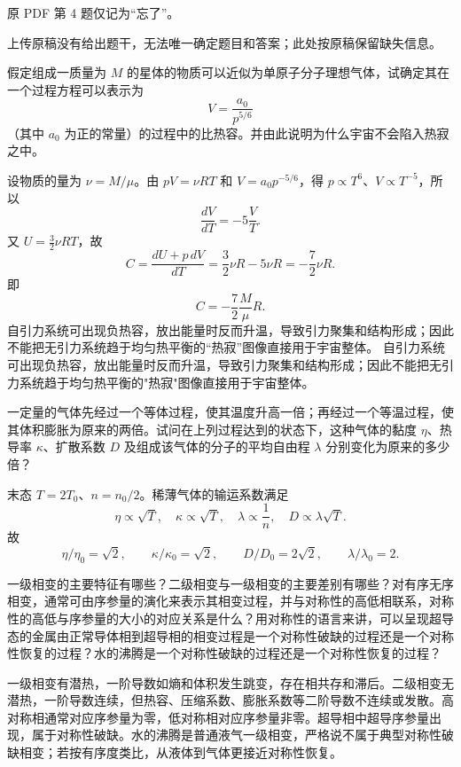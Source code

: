 \begin{question}
原 PDF 第 4 题仅记为“忘了”。
\begin{solution}
上传原稿没有给出题干，无法唯一确定题目和答案；此处按原稿保留缺失信息。
\end{solution}
\end{question}

\begin{question}
假定组成一质量为 $M$ 的星体的物质可以近似为单原子分子理想气体，试确定其在一个过程方程可以表示为
\[
V=\frac{a_0}{p^{5/6}}
\]
（其中 $a_0$ 为正的常量）的过程中的比热容。并由此说明为什么宇宙不会陷入热寂之中。
\begin{solution}
设物质的量为 $\nu=M/\mu$。由 $pV=\nu RT$ 和 $V=a_0p^{-5/6}$，得 $p\propto T^6$、$V\propto T^{-5}$，所以
\[
\frac{dV}{dT}=-5\frac{V}{T}.
\]
又 $U=\frac32\nu RT$，故
\[
C=\frac{dU+p\,dV}{dT}
=\frac32\nu R-5\nu R=-\frac72\nu R.
\]
即
\[
C=-\frac72\frac{M}{\mu}R.
\]
自引力系统可出现负热容，放出能量时反而升温，导致引力聚集和结构形成；因此不能把无引力系统趋于均匀热平衡的“热寂”图像直接用于宇宙整体。
自引力系统可出现负热容，放出能量时反而升温，导致引力聚集和结构形成；因此不能把无引力系统趋于均匀热平衡的"热寂"图像直接用于宇宙整体。
\end{solution}
\end{question}

\begin{question}
一定量的气体先经过一个等体过程，使其温度升高一倍；再经过一个等温过程，使其体积膨胀为原来的两倍。试问在上列过程达到的状态下，这种气体的黏度 $\eta$、热导率 $\kappa$、扩散系数 $D$ 及组成该气体的分子的平均自由程 $\lambda$ 分别变化为原来的多少倍？
\begin{solution}
末态 $T=2T_0$、$n=n_0/2$。稀薄气体的输运系数满足
\[
\eta\propto \sqrt T,
\quad
\kappa\propto \sqrt T,
\quad
\lambda\propto \frac1n,
\quad
D\propto \lambda\sqrt T.
\]
故
\[
\eta/\eta_0=\sqrt2,
\qquad \kappa/\kappa_0=\sqrt2,
\qquad D/D_0=2\sqrt2,
\qquad \lambda/\lambda_0=2.
\]
\end{solution}
\end{question}

\begin{question}
一级相变的主要特征有哪些？二级相变与一级相变的主要差别有哪些？对有序无序相变，通常可由序参量的演化来表示其相变过程，并与对称性的高低相联系，对称性的高低与序参量的大小的对应关系是什么？用对称性的语言来讲，可以呈现超导态的金属由正常导体相到超导相的相变过程是一个对称性破缺的过程还是一个对称性恢复的过程？水的沸腾是一个对称性破缺的过程还是一个对称性恢复的过程？
\begin{solution}
一级相变有潜热，一阶导数如熵和体积发生跳变，存在相共存和滞后。二级相变无潜热，一阶导数连续，但热容、压缩系数、膨胀系数等二阶导数不连续或发散。高对称相通常对应序参量为零，低对称相对应序参量非零。超导相中超导序参量出现，属于对称性破缺。水的沸腾是普通液气一级相变，严格说不属于典型对称性破缺相变；若按有序度类比，从液体到气体更接近对称性恢复。
\end{solution}
\end{question}

